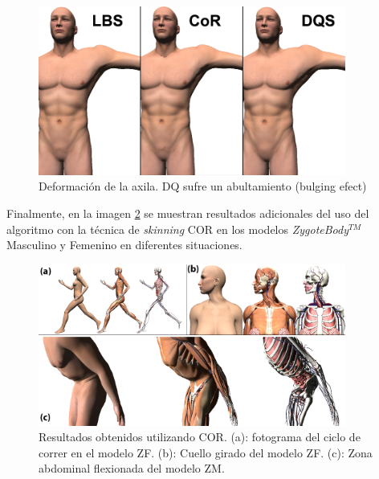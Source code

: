 \begin{figure}[h]%
  \centering
  \includegraphics[width=0.90\textwidth]{IMG/sobaco.png}
    \caption{ Deformación de la axila. DQ sufre un abultamiento (bulging efect)  }
    \label{fig:axila}
\end{figure}





Finalmente, en la imagen \ref{fig:run1} se muestran resultados adicionales del uso del algoritmo con la técnica de \emph{skinning} \ac{COR} en los modelos \emph{ZygoteBody}$^{TM}$ Masculino y Femenino en diferentes situaciones.

\begin{figure}%
   \centering
   \includegraphics[width=0.90\textwidth]{IMG/examples}
    \caption{Resultados obtenidos utilizando \ac{COR}. (a): fotograma del ciclo de correr en el modelo ZF. (b): Cuello girado del modelo ZF. (c): Zona abdominal flexionada del modelo ZM.}
    \label{fig:run1}
\end{figure}

